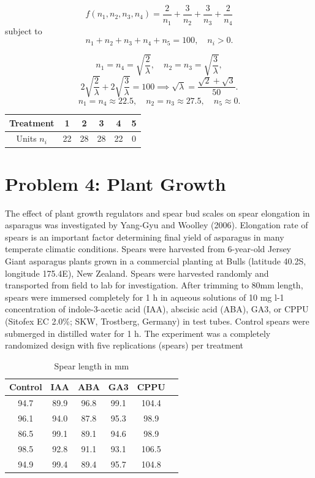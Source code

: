 \documentclass{article}
\begin{document}
\[
	f(n_1,n_2,n_3,n_4) = \frac{2}{n_1} + \frac{3}{n_2} + \frac{3}{n_3} + \frac{2}{n_4}
\]
subject to
\[
	n_1 + n_2 + n_3 + n_4 + n_5 = 100, \quad n_i > 0.
\]

\[
	n_1 = n_4 = \sqrt{\frac{2}{\lambda}}, \quad n_2 = n_3 = \sqrt{\frac{3}{\lambda}},
\]
\[
	2\sqrt{\frac{2}{\lambda}} + 2\sqrt{\frac{3}{\lambda}} = 100 \implies \sqrt{\lambda} = \frac{\sqrt{2}+\sqrt{3}}{50}.
\]
\[
	n_1 = n_4 \approx 22.5, \quad n_2 = n_3 \approx 27.5, \quad n_5 \approx 0.
\]

\begin{table}[h]
	\centering
	\begin{tabular}{cccccc}
		\toprule
		Treatment   & 1  & 2  & 3  & 4  & 5 \\
		\midrule
		Units $n_i$ & 22 & 28 & 28 & 22 & 0 \\
		\bottomrule
	\end{tabular}
\end{table}


\section*{Problem 4: Plant Growth}
The effect of plant growth regulators and spear bud scales on spear elongation in asparagus
was investigated by Yang-Gyu and Woolley (2006). Elongation rate of spears is an important factor
determining final yield of asparagus in many temperate climatic conditions. Spears were harvested
from 6-year-old Jersey Giant asparagus plants grown in a commercial planting at Bulls (latitude 40.2S,
longitude 175.4E), New Zealand. Spears were harvested randomly and transported from field to lab
for investigation. After trimming to 80mm length, spears were immersed completely for 1 h in aqueous
solutions of 10 mg l-1 concentration of indole-3-acetic acid (IAA), abscisic acid (ABA), GA3, or CPPU
(Sitofex EC 2.0\%; SKW, Trostberg, Germany) in test tubes. Control spears were submerged in distilled
water for 1 h. The experiment was a completely randomized design with five replications (spears) per
treatment
\begin{table}[!ht]
	\centering
	\caption{Spear length in mm}
	\begin{tabular}{c c c c c c}
		\hline
		\textbf{Control} & \textbf{IAA} & \textbf{ABA} & \textbf{GA3} & \textbf{CPPU} \\
		\hline
		94.7             & 89.9         & 96.8         & 99.1         & 104.4         \\
		96.1             & 94.0         & 87.8         & 95.3         & 98.9          \\
		86.5             & 99.1         & 89.1         & 94.6         & 98.9          \\
		98.5             & 92.8         & 91.1         & 93.1         & 106.5         \\
		94.9             & 99.4         & 89.4         & 95.7         & 104.8         \\
		\hline
	\end{tabular}
\end{table}
\end{document}
